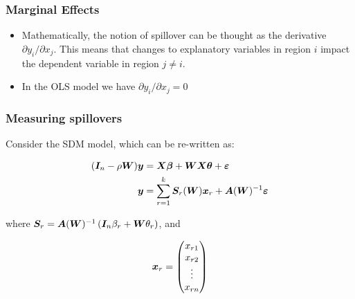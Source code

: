 \documentclass[english,10pt]{beamer}\usepackage[]{graphicx}\usepackage[]{xcolor}
\begin{document}
\begin{frame}
  \frametitle{Marginal Effects}
    \begin{itemize}
      \item Mathematically, the notion of spillover can be thought as the derivative $\partial y_i/ \partial x_j$. This means that changes to explanatory variables in region $i$ impact the dependent variable in region $j\neq i$.
      \item In the OLS model we have $\partial y_i/ \partial x_j = 0$
    \end{itemize}
\end{frame}

\begin{frame}
  \frametitle{Measuring spillovers}
    Consider the SDM model, which can be re-written as:


\begin{equation}
\begin{aligned}
(\bm I_n - \rho\bm W)\bm y & = \bm X\bm \beta + \bm W\bm X\bm \theta + \bm {\varepsilon} \\
\bm y & =   \sum_{r=1}^k\bm S_r(\bm W)\bm x_r + \bm A(\bm W)^{-1}\bm {\varepsilon}
\end{aligned}
\end{equation}

where $\bm S_r = \bm A(\bm W)^{-1}\left(\bm I_n\beta_r + \bm W\theta_r\right)$, and

\begin{equation*}
 \bm x_r = \begin{pmatrix}
          x_{r1} \\
          x_{r2} \\
          \vdots \\
          x_{rn}
        \end{pmatrix}
\end{equation*}
\end{frame}
\end{document}
